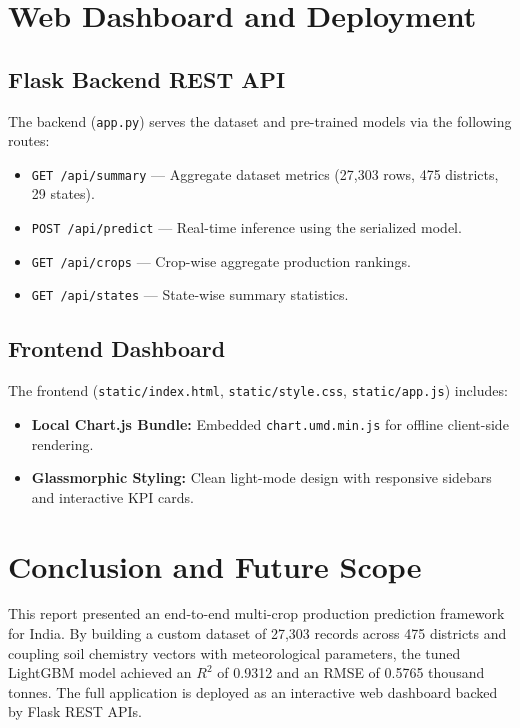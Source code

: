 \documentclass[11pt,a4paper]{article}
\begin{document}
\section{Web Dashboard and Deployment}
\label{sec:deployment}

\subsection{Flask Backend REST API}
The backend (\texttt{app.py}) serves the dataset and pre-trained models via the following routes:
\begin{itemize}
    \item \texttt{GET /api/summary} --- Aggregate dataset metrics (27,303 rows, 475 districts, 29 states).
    \item \texttt{POST /api/predict} --- Real-time inference using the serialized model.
    \item \texttt{GET /api/crops} --- Crop-wise aggregate production rankings.
    \item \texttt{GET /api/states} --- State-wise summary statistics.
\end{itemize}

\subsection{Frontend Dashboard}
The frontend (\texttt{static/index.html}, \texttt{static/style.css}, \texttt{static/app.js}) includes:
\begin{itemize}
    \item \textbf{Local Chart.js Bundle:} Embedded \texttt{chart.umd.min.js} for offline client-side rendering.
    \item \textbf{Glassmorphic Styling:} Clean light-mode design with responsive sidebars and interactive KPI cards.
\end{itemize}

\section{Conclusion and Future Scope}
\label{sec:conclusion}

This report presented an end-to-end multi-crop production prediction framework for India. By building a custom dataset of 27,303 records across 475 districts and coupling soil chemistry vectors with meteorological parameters, the tuned LightGBM model achieved an $R^2$ of 0.9312 and an RMSE of 0.5765 thousand tonnes. The full application is deployed as an interactive web dashboard backed by Flask REST APIs.
\end{document}
